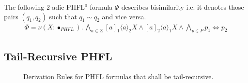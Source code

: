 \begin{example}{\cite{lange2014capturing}}
    \label{example:phfl_order_0}
    The following $2$-adic PHFL$^0$ formula $\Phi$ describes bisimilarity i.e. it denotes
    those pairs $(q_1, q_2)$ such that $q_1 \sim q_2$ and vice versa.
    \begin{align*}
        \Phi = \nu (X \colon \bullet_{PHFL}).\,
        \underset{a \in \Sigma}{\bigwedge} [a]_1 \langle a \rangle_2 X \wedge [a]_2 \langle a \rangle_1 X \wedge
        \underset{p \in P}{\bigwedge} p_1 \Leftrightarrow p_2
    \end{align*}
\end{example}

\subsection{Tail-Recursive PHFL}\label{subsec:tail-recursivePhfl}


\begin{figure}
    \caption{Derivation Rules for PHFL formulas that shall be tail-recursive.}
    \label{figure:phfl-tail-recursive}
\end{figure}

